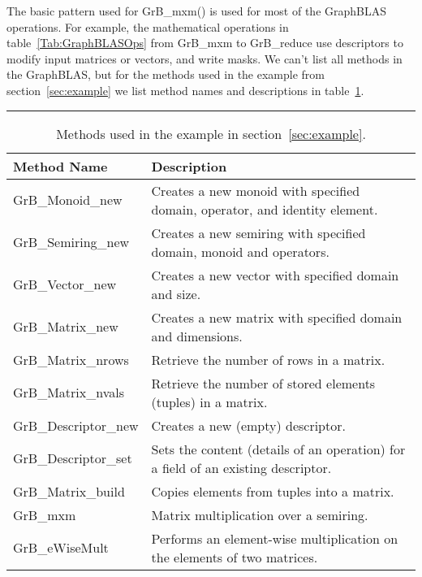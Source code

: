 The basic pattern used for {\sf GrB\_mxm()} is used for most of the GraphBLAS operations.
For example, the mathematical operations in 
table~\ref{Tab:GraphBLASOps}  from {\sf GrB\_mxm} to {\sf GrB\_reduce}
use descriptors to modify input matrices or vectors, and write masks.  
We can't list all methods in the GraphBLAS, but for the methods used in the example from section~\ref{sec:example}
we list method names and descriptions in table~\ref{Tab:GrBmethods}.    
 
\begin{table}[h]
\hrule
\begin{center}
\caption{Methods used in the example in section~\ref{sec:example}.}
\label{Tab:GrBmethods}
\begin{tabular}{lp{5.25cm}}
Method Name                     & Description    \\
\hline
	{\sf GrB\_Monoid\_new}      & Creates a new monoid with specified domain, operator, and identity element.    \\
	{\sf GrB\_Semiring\_new}    & Creates a new semiring with specified domain, monoid and operators.               \\
	{\sf GrB\_Vector\_new}      & Creates a new vector with specified domain and size.                                \\
	{\sf GrB\_Matrix\_new}      & Creates a new matrix with specified domain and dimensions.                          \\
	{\sf GrB\_Matrix\_nrows}    & Retrieve the number of rows in a matrix.                                            \\
	{\sf GrB\_Matrix\_nvals}    & Retrieve the number of stored elements (tuples) in a matrix.                        \\
	{\sf GrB\_Descriptor\_new}  & Creates a new (empty) descriptor.                                                  \\
	{\sf GrB\_Descriptor\_set}  & Sets the content (details of an operation) for a field of an existing descriptor.   \\
	{\sf GrB\_Matrix\_build}    & Copies elements from tuples into a matrix.                                         \\
	{\sf GrB\_mxm}              & Matrix multiplication over a semiring.                              \\
	{\sf GrB\_eWiseMult}        & Performs an element-wise multiplication on the elements of two matrices.            \\

\end{tabular}
\end{center}
\end{table}

